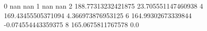 0 nan nan
1 nan nan
2 188.77313232421875 23.705551147460938
4 169.43455505371094 4.366973876953125
6 164.99302673339844 -0.074554443359375
8 165.0675811767578 0.0
